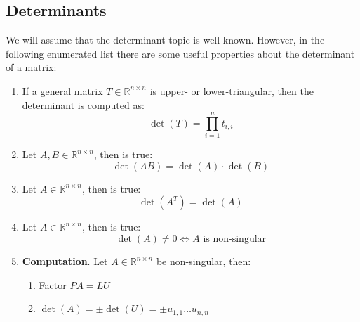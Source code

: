 \subsection{Determinants}

We will assume that the determinant topic is well known. However, in the following enumerated list there are some useful properties about the determinant of a matrix:
\begin{enumerate}
	\item If a general matrix $T \in \mathbb{R}^{n \times n}$ is upper- or lower-triangular, then the determinant is computed as:
	\begin{equation*}
		\det\left(T\right) = \displaystyle\prod_{i = 1}^{n} t_{i,i}
	\end{equation*}
	
	\item Let $A,B \in \mathbb{R}^{n \times n}$, then is true:
	\begin{equation*}
		\det\left(AB\right) = \det\left(A\right) \cdot \det\left(B\right)
	\end{equation*}
	
	\item Let $A \in \mathbb{R}^{n \times n}$, then is true:
	\begin{equation*}
		\det\left(A^{T}\right) = \det\left(A\right)
	\end{equation*}
	
	\item Let $A \in \mathbb{R}^{n \times n}$, then is true:
	\begin{equation*}
		\det\left(A\right) \ne 0 \iff A \text{ is non-singular}
	\end{equation*}
	
	\item \textbf{Computation}. Let $A \in \mathbb{R}^{n \times n}$ be non-singular, then:
	\begin{enumerate}
		\item Factor $PA = LU$
		\item $\det\left(A\right) = \pm\det\left(U\right) = \pm u_{1,1} \dots u_{n,n}$
	\end{enumerate}
\end{enumerate}